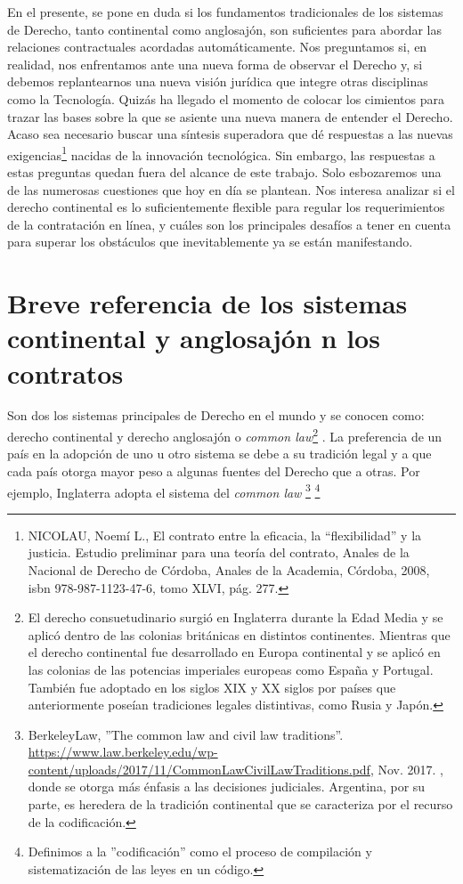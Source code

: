 \documentclass[12pt]{report} %
\begin{document}
\begin{itemize}
En el presente, se pone en duda si los fundamentos tradicionales de los sistemas de Derecho, tanto continental como anglosajón, son suficientes para abordar las relaciones contractuales acordadas automáticamente. Nos preguntamos si, en realidad, nos enfrentamos ante una nueva forma de observar el Derecho y, si debemos replantearnos una nueva visión jurídica que integre otras disciplinas como la Tecnología. Quizás ha llegado el momento de colocar los cimientos para trazar las bases sobre la que se asiente una nueva manera de entender el Derecho. Acaso sea necesario buscar una síntesis superadora que dé respuestas a las nuevas exigencias\footnote{NICOLAU, Noemí L., El contrato entre la eficacia, la “flexibilidad” y la justicia. Estudio preliminar para una teoría del contrato, Anales de la Nacional de Derecho de Córdoba, Anales de la Academia, Córdoba, 2008, isbn 978-987-1123-47-6, tomo XLVI, pág. 277.}  nacidas de la innovación tecnológica. Sin embargo, las respuestas a estas preguntas quedan fuera del alcance de este trabajo. Solo esbozaremos una de las numerosas cuestiones que hoy en día se plantean. Nos interesa analizar si el derecho continental es lo suficientemente flexible para regular los requerimientos de la contratación en línea, y cuáles son los principales desafíos a tener en cuenta para superar los obstáculos que inevitablemente ya se están manifestando.


\section{Breve referencia de los sistemas continental y anglosajón n los
contratos}


Son dos los sistemas principales de Derecho en el mundo y se conocen como: derecho continental y derecho anglosajón o \textit{common law}\footnote{El derecho consuetudinario surgió en Inglaterra durante la Edad Media y se aplicó dentro de las colonias británicas en distintos continentes. Mientras que el derecho continental fue desarrollado en Europa continental y se aplicó en las colonias de las potencias imperiales europeas como España y Portugal. También fue adoptado en los siglos XIX y XX siglos por países que anteriormente poseían tradiciones legales distintivas, como Rusia y Japón.} . La preferencia de un país en la adopción de uno u otro sistema se debe a su tradición legal y a que cada país otorga mayor peso a algunas fuentes del Derecho que a otras. Por ejemplo, Inglaterra adopta el sistema del \textit{common law} \footnote{BerkeleyLaw, ''The common law and civil law traditions''. 
\url{https://www.law.berkeley.edu/wp-content/uploads/2017/11/CommonLawCivilLawTraditions.pdf}, Nov. 2017.
, donde se otorga más énfasis a las decisiones  judiciales. Argentina, por su parte, es heredera de la tradición continental que se caracteriza por el recurso de la codificación.} 
\footnote{Definimos a la ''codificación'' como el proceso de compilación y sistematización de las leyes en un código.}


\end{itemize}
\end{document}
